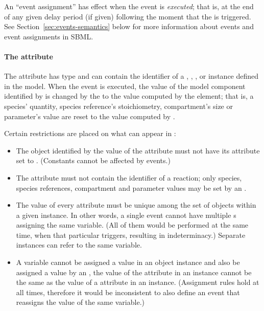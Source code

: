 An ``event assignment'' has effect when the event is
\emph{executed}; that is, at the end of any given delay period (if
given) following the moment that the \Event is triggered.  See
Section~\ref{sec:events-semantics} below for more information
about events and event assignments in SBML.


\paragraph{The  attribute}

The \Event attribute  has type
 and can contain the identifier of a
\Compartment, \Species, \SpeciesReference, or \Parameter instance
defined in the model.  When the event is executed, the value of
the model component identified by  is changed by
the \EventAssignment to the value computed by the 
element; that is, a species' quantity, species reference's
stoichiometry, compartment's size or parameter's value are reset
to the value computed by .

Certain restrictions are placed on what can appear in
:
\begin{itemize}
  
\item The object identified by the value of the 
  attribute must not have its  attribute set 
  to .  (Constants cannot be affected by events.)
  
\item The  attribute must not contain the
  identifier of a reaction; only species, species references,
  compartment and parameter values may be set by an \Event.
  
\item The value of every  attribute must be unique
  among the set of \EventAssignment objects within a given
  \Event instance.  In other words, a single event cannot have
  multiple \EventAssignment{}s assigning the same variable.  (All
  of them would be performed at the same time, when that
  particular \Event triggers, resulting in indeterminacy.)
  Separate \Event instances can refer to the same variable.
  
\item A variable cannot be assigned a value in an \EventAssignment
  object instance and also be assigned a value by an
  \AssignmentRule, \ie the value of the  attribute
  in an \EventAssignment instance cannot be the same as the value
  of a  attribute in an \AssignmentRule instance.
  (Assignment rules hold at all times, therefore it would be
  inconsistent to also define an event that reassigns the value of
  the same variable.)

\end{itemize}

